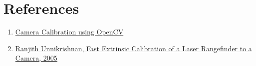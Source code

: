 \documentclass[10pt]{article}
\begin{document}
    \vspace*{0pt} \vfill
    \section*{\textbf{References}}
    \begin{enumerate}
        \item \href{https://learnopencv.com/camera-calibration-using-opencv/}{
            Camera Calibration using OpenCV
        }
        \item \href{https://www.ri.cmu.edu/pub_files/pub4/unnikrishnan_ranjith_2005_3/unnikrishnan_ranjith_2005_3.pdf}{
            Ranjith Unnikrishnan, Fast Extrinsic Calibration of a Laser Rangefinder to a Camera, 2005
        }
    \end{enumerate}
\end{document}
